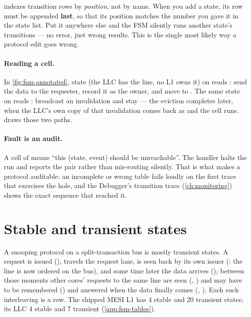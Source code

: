 \begin{trapbox}
 indexes transition rows by \emph{position}, not by name. When you add a state,
its row must be appended \textbf{last}, so that its position matches the number you gave it in
the state list. Put it anywhere else and the FSM silently runs another state's transitions ---
no error, just wrong results. This is the single most likely way a protocol edit goes wrong.
\end{trapbox}

\paragraph{Reading a cell.} In \cref{fig:fsm-annotated}, state  (the LLC has the line,
no L1 owns it) on  reads : send the data to the
requester, record it as the owner, and move to . The same state on
 reads : broadcast an invalidation and stay --- the eviction
completes later, when the LLC's own copy of that invalidation comes back as
 and the cell  runs.  draws those
two paths.

\paragraph{Fault is an audit.} A cell of  means ``this (state, event) should be
unreachable''. The handler halts the run and reports the pair rather than mis-routing silently.
That is what makes a protocol auditable: an incomplete or wrong table fails loudly on the first
trace that exercises the hole, and the Debugger's transition trace (\cref{ch:monitoring}) shows
the exact sequence that reached it.

\section{Stable and transient states}

A snooping protocol on a split-transaction bus is mostly transient states. A request is issued
(), travels the request lane, is seen back by its own issuer (: the
line is now ordered on the bus), and some time later the data arrives (); between
those moments other cores' requests to the same line are seen (,
) and may have to be remembered () and answered when the data
finally comes (, ). Each such interleaving is a row. The shipped
MESI L1 has 4 stable and 20 transient states; its LLC 4 stable and 7 transient
(\cref{app:fsm-tables}).

